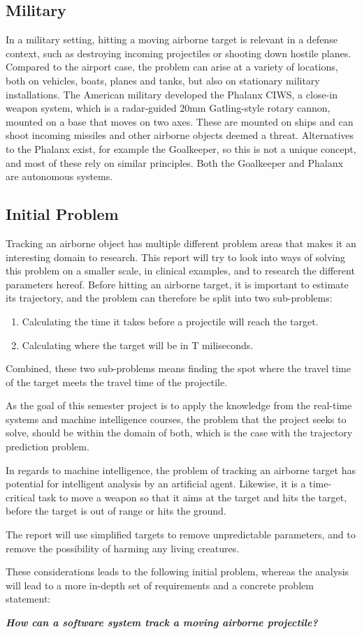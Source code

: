 \subsection{Military}
In a military setting, hitting a moving airborne target is relevant in a defense context, such as destroying incoming projectiles or shooting down hostile planes.
Compared to the airport case, the problem can arise at a variety of locations, both on vehicles, boats, planes and tanks, but also on stationary military installations.
The American military developed the Phalanx CIWS, a close-in weapon system, which is a radar-guided 20mm Gatling-style rotary cannon, mounted on a base that moves on two axes.
These are mounted on ships and can shoot incoming missiles and other airborne objects deemed a threat.
Alternatives to the Phalanx exist, for example the Goalkeeper, so this is not a unique concept, and most of these rely on similar principles.
Both the Goalkeeper and Phalanx are autonomous systems.

\subsection{Initial Problem}
Tracking an airborne object has multiple different problem areas that makes it an interesting domain to research.
This report will try to look into ways of solving this problem on a smaller scale, in clinical examples, and to research the different parameters hereof.
Before hitting an airborne target, it is important to estimate its trajectory, and the problem can therefore be split into two sub-problems:
\begin{enumerate}
  \item Calculating the time it takes before a projectile will reach the target.
  \item Calculating where the target will be in T miliseconds.
\end{enumerate}
Combined, these two sub-problems means finding the spot where the travel time of the target meets the travel time of the projectile.

As the goal of this semester project is to apply the knowledge from the real-time systems and machine intelligence courses, the problem that the project seeks to solve, should be within the domain of both, which is the case with the trajectory prediction problem.

In regards to machine intelligence, the problem of tracking an airborne target has potential for intelligent analysis by an artificial agent.
Likewise, it is a time-critical task to move a weapon so that it aims at the target and hits the target, before the target is out of range or hits the ground.

The report will use simplified targets to remove unpredictable parameters, and to remove the possibility of harming any living creatures.

These considerations leads to the following initial problem, whereas the analysis will lead to a more in-depth set of requirements and a concrete problem statement:
\label{key:initialProblem}

\begin{center}
  \textit{\textbf{How can a software system track a moving airborne projectile?}}
\end{center}
